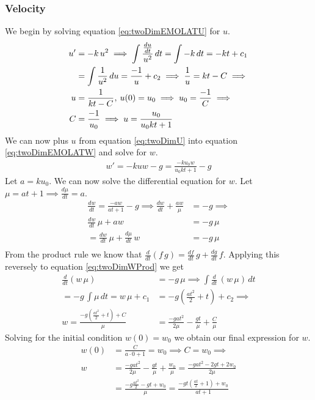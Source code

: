 \documentclass[%
aip,
jmp,
amsmath,amssymb,
reprint,%
]{revtex4-1}
\newcommand{\comma}{\hspace{0.1mm},\hspace{0.7mm}}
\begin{document}
	\subsubsection{Velocity}
	We begin by solving equation \eqref{eq:twoDimEMOLATU} for $u$.
	\begin{align}\nonumber
	u' &= -k\,u^2 \implies \int \frac{\frac{du}{dt}}{u^2}\,dt = \int -k\,dt = -kt + 
	c_1\\\nonumber
	&= \int \frac{1}{u^2}\,du = \frac{-1}{u} +c_2 \implies \frac{1}{u} = kt - C \implies \\\nonumber
	u &= \frac{1}{kt-C} \comma u(0) = u_0 \implies u_0 = \frac{-1}{C} \implies\\\label{eq:twoDimU}
	C &= \frac{-1}{u_0} \implies u = \frac{u_0}{u_0kt+1}
	\end{align}
	We can now plus $u$ from equation \eqref{eq:twoDimU} into equation \eqref{eq:twoDimEMOLATW} and solve for $w$.
	\begin{align}\nonumber
		w' = -kuw-g = \frac{-ku_0w}{u_0kt+1}-g
	\end{align}
	Let $a = ku_0$. We can now solve the differential equation for $w$. Let $\mu = at+1 \implies \frac{d\mu}{dt} = a$.
	\begin{align}\nonumber
		\frac{dw}{dt} = \frac{-aw}{at+1}-g \implies \frac{dw}{dt} + \frac{aw}{\mu} &= -g \implies\\\nonumber
		\frac{dw}{dt}\,\mu + aw &= -g\,\mu \\\label{eq:twoDimWProd}
		=\frac{dw}{dt}\,\mu + \frac{d\mu}{dt}\,w &= -g\,\mu\\\nonumber
	\end{align}
	From the product rule we know that $\frac{d}{dt}(f\,g) = \frac{df}{dt}\,g+\frac{dg}{dt}\,f$. Applying this reversely to equation \eqref{eq:twoDimWProd} we get
	\begin{align}\nonumber
		\frac{d}{dt}(w\,\mu) &= -g\,\mu\implies\int\frac{d}{dt}\,(w\,\mu)\,dt\\\nonumber
		= -g\,\int \mu\,dt = w\,\mu+c_1 &= -g(\frac{at^2}{2}+t)+c_2\implies\\\nonumber
		w = \frac{-g(\frac{at^2}{2}+t)+C}{\mu} &= \frac{-gat^2}{2\mu}-\frac{gt}{\mu}+\frac{C}{\mu}
	\end{align}
	Solving for the initial condition $w(0) = w_0$ we obtain our final expression for $w$.
	\begin{align}\nonumber
		w(0) &= \frac{C}{a\cdot 0+1} = w_0 \implies C = w_0 \implies\\\nonumber
		w &= \frac{-gat^2}{2\mu}-\frac{gt}{\mu}+\frac{w_0}{\mu} = \frac{-gat^2-2gt+2w_0}{2\mu}\\\nonumber
		&= \frac{-g\frac{at^2}{2}-gt+w_0}{\mu} = \frac{-gt(\frac{at}{2}+1)+w_0}{at+1}
	\end{align}
\end{document}
